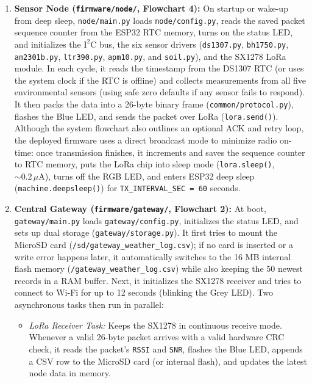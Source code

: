 \documentclass[conference,onecolumn]{IEEEtran}
\begin{document}
\begin{enumerate}
    \item \textbf{Sensor Node (\texttt{firmware/node/}, Flowchart 4):} On startup or wake-up from deep sleep, \texttt{node/main.py} loads \texttt{node/config.py}, reads the saved packet sequence counter from the ESP32 RTC memory, turns on the status LED, and initializes the $\text{I}^2\text{C}$ bus, the six sensor drivers (\texttt{ds1307.py}, \texttt{bh1750.py}, \texttt{am2301b.py}, \texttt{ltr390.py}, \texttt{apm10.py}, and \texttt{soil.py}), and the SX1278 LoRa module. In each cycle, it reads the timestamp from the DS1307 RTC (or uses the system clock if the RTC is offline) and collects measurements from all five environmental sensors (using safe zero defaults if any sensor fails to respond). It then packs the data into a 26-byte binary frame (\texttt{common/protocol.py}), flashes the Blue LED, and sends the packet over LoRa (\texttt{lora.send()}). Although the system flowchart also outlines an optional ACK and retry loop, the deployed firmware uses a direct broadcast mode to minimize radio on-time: once transmission finishes, it increments and saves the sequence counter to RTC memory, puts the LoRa chip into sleep mode (\texttt{lora.sleep()}, $\sim 0.2\,\mu\text{A}$), turns off the RGB LED, and enters ESP32 deep sleep (\texttt{machine.deepsleep()}) for \texttt{TX\_INTERVAL\_SEC = 60} seconds.
    \item \textbf{Central Gateway (\texttt{firmware/gateway/}, Flowchart 2):} At boot, \texttt{gateway/main.py} loads \texttt{gateway/config.py}, initializes the status LED, and sets up dual storage (\texttt{gateway/storage.py}). It first tries to mount the MicroSD card (\texttt{/sd/gateway\_weather\_log.csv}); if no card is inserted or a write error happens later, it automatically switches to the 16 MB internal flash memory (\texttt{/gateway\_weather\_log.csv}) while also keeping the 50 newest records in a RAM buffer. Next, it initializes the SX1278 receiver and tries to connect to Wi-Fi for up to 12 seconds (blinking the Grey LED). Two asynchronous tasks then run in parallel:
    \begin{itemize}
        \item \textit{LoRa Receiver Task:} Keeps the SX1278 in continuous receive mode. Whenever a valid 26-byte packet arrives with a valid hardware CRC check, it reads the packet's \texttt{RSSI} and \texttt{SNR}, flashes the Blue LED, appends a CSV row to the MicroSD card (or internal flash), and updates the latest node data in memory.

\end{itemize}
\end{enumerate}
\end{document}
